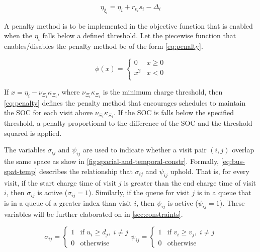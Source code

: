 \documentclass[11pt,a4paper,final]{article}
\begin{document}
\begin{equation}
\label{eq:bat-chain}
  \eta_{\xi_i} = \eta_i + r_{v_i}s_i - \Delta_i
\end{equation}

A penalty method is to be implemented in the objective function that is enabled when the \(\eta_i\) falls below a defined
threshold. Let the piecewise function that enables/disables the penalty method be of the form \ref{eq:penalty}.

\begin{equation}
\label{eq:penalty}
  \phi(x) =
  \begin{cases}
    0   & x \ge 0 \\
    x^2 & x < 0\\
  \end{cases}
\end{equation}

If \(x = \eta_i - \nu_{\Xi_i} \kappa_{\Xi_i}\), where \(\nu_{\Xi_i} \kappa_{\Xi_i}\) is the minimum charge threshold, then \ref{eq:penalty} defines the
penalty method that encourages schedules to maintain the SOC for each visit above \(\nu_{\Xi_i} \kappa_{\Xi_i}\). If the SOC is falls
below the specified threshold, a penalty proportional to the difference of the SOC and the threshold squared is applied.

The variables \(\sigma_{ij}\) and \(\psi_{ij}\) are used to indicate whether a visit pair \((i, j)\) overlap the same space as show in
\ref{fig:spacial-and-temporal-constr}. Formally, \ref{eq:bus-spat-temp} describes the relationship that \(\sigma_{ij}\) and \(\psi_{ij}\)
uphold. That is, for every visit, if the start charge time of visit \(j\) is greater than the end charge time of visit
\(i\), then \(\sigma_{ij}\) is active (\(\sigma_{ij} = 1\)). Similarly, if the queue for visit \(j\) is in a queue that is in a queue of a
greater index than visit \(i\), then \(\psi_{ij}\) is active (\(\psi_{ij} = 1\)). These variables will be further elaborated on in
\ref{sec:constraints}.

\begin{subequations}
\label{eq:bus-spat-temp}
\begin{equation}
  \sigma_{ij} =
  \begin{cases}
    1 & \text{if } u_i \ge d_j, \; i \ne j\\
    0 & \text{otherwise}
  \end{cases}
\end{equation}

\begin{equation}
  \psi_{ij} =
  \begin{cases}
    1 & \text{if } v_i \ge v_j,\; i \ne j\\
    0 & \text{otherwise}
  \end{cases}
\end{equation}
\end{subequations}
\end{document}
